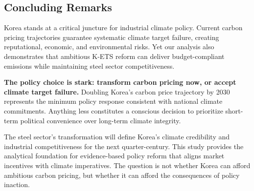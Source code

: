 \documentclass[preprint,1p,authoryear]{elsarticle}
\begin{document}
\subsection{Concluding Remarks}

Korea stands at a critical juncture for industrial climate policy. Current carbon pricing trajectories guarantee systematic climate target failure, creating reputational, economic, and environmental risks. Yet our analysis also demonstrates that ambitious K-ETS reform can deliver budget-compliant emissions while maintaining steel sector competitiveness.

\textbf{The policy choice is stark: transform carbon pricing now, or accept climate target failure.} Doubling Korea's carbon price trajectory by 2030 represents the minimum policy response consistent with national climate commitments. Anything less constitutes a conscious decision to prioritize short-term political convenience over long-term climate integrity.

The steel sector's transformation will define Korea's climate credibility and industrial competitiveness for the next quarter-century. This study provides the analytical foundation for evidence-based policy reform that aligns market incentives with climate imperatives. The question is not whether Korea can afford ambitious carbon pricing, but whether it can afford the consequences of policy inaction.




\end{document}
